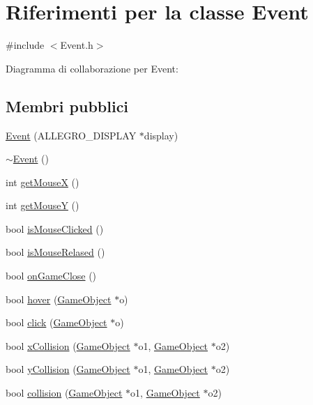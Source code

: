 \hypertarget{class_event}{}\section{Riferimenti per la classe Event}
\label{class_event}


{\ttfamily \#include $<$Event.\+h$>$}



Diagramma di collaborazione per Event\+:
\subsection*{Membri pubblici}
\begin{DoxyCompactItemize}
\item 
\hyperlink{class_event_ab854ceb7d4026d5da229d217a92c20a2}{Event} (A\+L\+L\+E\+G\+R\+O\+\_\+\+D\+I\+S\+P\+L\+AY $\ast$display)
\item 
\hyperlink{class_event_a7704ec01ce91e673885792054214b3d2}{$\sim$\+Event} ()
\item 
int \hyperlink{class_event_a6a20aa19f226a56d581709c877131675}{get\+MouseX} ()
\item 
int \hyperlink{class_event_a56da0d8e366e0d83c8594fa89131aeb7}{get\+MouseY} ()
\item 
bool \hyperlink{class_event_a87306ff008f2ad0b2dae24abe2052e74}{is\+Mouse\+Clicked} ()
\item 
bool \hyperlink{class_event_a34ef498a16a479389c36bd6fb4003124}{is\+Mouse\+Relased} ()
\item 
bool \hyperlink{class_event_a16c21ad8dd851778c3755299812e59cb}{on\+Game\+Close} ()
\item 
bool \hyperlink{class_event_a4c463ba66caea5213566b4a68d739e2c}{hover} (\hyperlink{class_game_object}{Game\+Object} $\ast$o)
\item 
bool \hyperlink{class_event_a337e66f37a949969601f8945177cd8b4}{click} (\hyperlink{class_game_object}{Game\+Object} $\ast$o)
\item 
bool \hyperlink{class_event_aa3cbc8415875fe920b17f86ddc8b854e}{x\+Collision} (\hyperlink{class_game_object}{Game\+Object} $\ast$o1, \hyperlink{class_game_object}{Game\+Object} $\ast$o2)
\item 
bool \hyperlink{class_event_a6c8a0a72741f728ad6d6126dd7ae08f5}{y\+Collision} (\hyperlink{class_game_object}{Game\+Object} $\ast$o1, \hyperlink{class_game_object}{Game\+Object} $\ast$o2)
\item 
bool \hyperlink{class_event_a71e03972236ec5222900d17e86027943}{collision} (\hyperlink{class_game_object}{Game\+Object} $\ast$o1, \hyperlink{class_game_object}{Game\+Object} $\ast$o2)
\end{DoxyCompactItemize}


